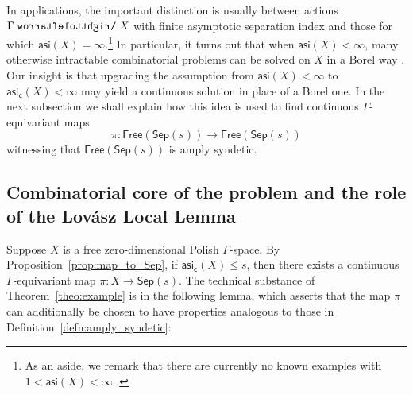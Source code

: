 \documentclass[11pt,reqno,psamsfonts]{amsart}
\theoremstyle{bfnote}
\newtheorem{prop}[theo]{Proposition}
\theoremstyle{definition}
\theoremstyle{remark}
\newcommand{\0}{\varnothing}
\renewcommand{\leq}{\leqslant}
\newcommand{\bemph}[1]{{\normalfont#1}}
\newcommand{\ep}[1]{\bemph{(}#1\bemph{)}}
\newcommand{\red}[1]{{\color{red}#1}}
\newcommand{\todo}[1]{\red{\textbf{\upshape{[#1]}}}}
\newcommand{\acts}{\mathrel{\reflectbox{$\righttoleftarrow$}}}
\newcommand{\G}{\Gamma}
\newcommand{\Free}{\mathsf{Free}}
\newcommand{\N}{\mathbb{N}}
\newcommand{\Z}{\mathbb{Z}}
\newcommand{\asi}{\mathsf{asi}}
\newcommand{\casi}{\asi_{\mathsf{c}}}
\newcommand{\sr}{amply syndetic\xspace}
\newcommand{\Sep}{\mathsf{Sep}}
\numberwithin{equation}{section}
\newenvironment{scproof}[1][]{\begin{proof}[\textsc{\upshape{Proof}}#1]}{\end{proof}}
\begin{document}

    In applications, the important distinction is usually between actions $\G \acts X$ with finite asymptotic separation index and those for which $\asi(X) = \infty$.\footnote{As an aside, we remark that there are currently no known examples with $1 < \asi(X) < \infty$ \cite[3191]{CJMSTD}.} In particular, it turns out that when $\asi(X) < \infty$, many otherwise intractable combinatorial problems can be solved on $X$ in a Borel way \cite{ASIalgorithms,BW,BWKonig,CJMSTD,WeilacherFinDim}. Our insight is that 
    upgrading the assumption from $\asi(X) < \infty$ to $\casi(X) < \infty$ may yield a {continuous} solution in place of a Borel one. In the next subsection we shall explain how this idea is used to find continuous $\G$-equivariant maps \[\pi \colon \Free(\Sep(s)) \to \Free(\Sep(s))\] witnessing that $\Free(\Sep(s))$ is \sr.

    \subsection{Combinatorial core of the problem and the role of the Lov\'asz Local Lemma}\label{subsubsec:combi+LLL}

    Suppose $X$ is a free zero-dimensional Polish $\G$-space. %
    By Proposition~\ref{prop:map_to_Sep}, if $\casi(X) \leq s$, then there exists a continuous $\G$-equivariant map $\pi \colon X \to \Sep(s)$. The technical substance of Theorem~\ref{theo:example} is in the following lemma, which asserts that the map $\pi$ can additionally be chosen to have properties analogous to those in Definition~\ref{defn:amply_syndetic}: %
    
\end{document}
